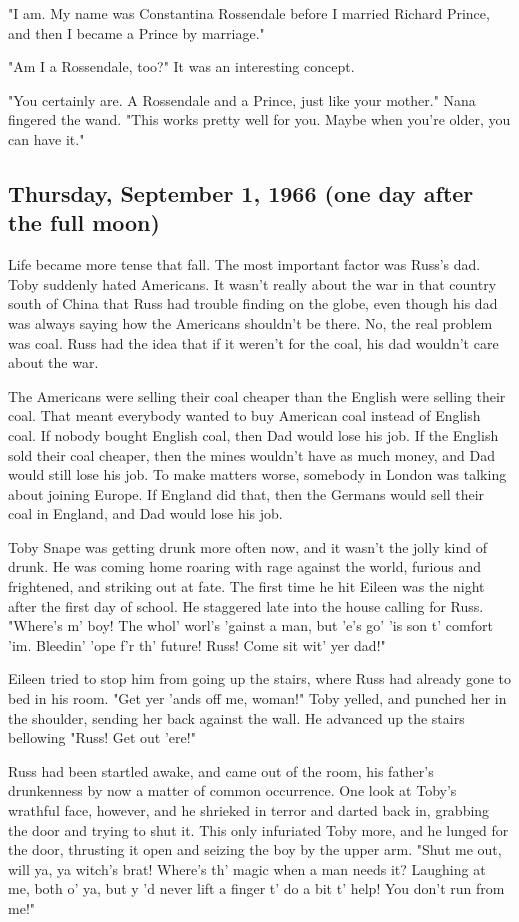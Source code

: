 "I am. My name was Constantina Rossendale before I married Richard Prince, and then I became a Prince by marriage."

"Am I a Rossendale, too?" It was an interesting concept.

"You certainly are. A Rossendale and a Prince, just like your mother." Nana fingered the wand. "This works pretty well for you. Maybe when you're older, you can have it."

\subsection{Thursday, September 1, 1966 (one day after the full moon)}

Life became more tense that fall. The most important factor was Russ's dad. Toby suddenly hated Americans. It wasn't really about the war in that country south of China that Russ had trouble finding on the globe, even though his dad was always saying how the Americans shouldn't be there. No, the real problem was coal. Russ had the idea that if it weren't for the coal, his dad wouldn't care about the war.

The Americans were selling their coal cheaper than the English were selling their coal. That meant everybody wanted to buy American coal instead of English coal. If nobody bought English coal, then Dad would lose his job. If the English sold their coal cheaper, then the mines wouldn't have as much money, and Dad would still lose his job. To make matters worse, somebody in London was talking about joining Europe. If England did that, then the Germans would sell their coal in England, and Dad would lose his job.

Toby Snape was getting drunk more often now, and it wasn't the jolly kind of drunk. He was coming home roaring with rage against the world, furious and frightened, and striking out at fate. The first time he hit Eileen was the night after the first day of school. He staggered late into the house calling for Russ. "Where's m' boy! The whol' worl's 'gainst a man, but 'e's go' 'is son t' comfort 'im. Bleedin' 'ope f'r th' future! Russ! Come sit wit' yer dad!"

Eileen tried to stop him from going up the stairs, where Russ had already gone to bed in his room. "Get yer 'ands off me, woman!" Toby yelled, and punched her in the shoulder, sending her back against the wall. He advanced up the stairs bellowing "Russ! Get out 'ere!"

Russ had been startled awake, and came out of the room, his father's drunkenness by now a matter of common occurrence. One look at Toby's wrathful face, however, and he shrieked in terror and darted back in, grabbing the door and trying to shut it. This only infuriated Toby more, and he lunged for the door, thrusting it open and seizing the boy by the upper arm. "Shut me out, will ya, ya witch's brat! Where's th' magic when a man needs it? Laughing at me, both o' ya, but y 'd never lift a finger t' do a bit t' help! You don't run from me!"

